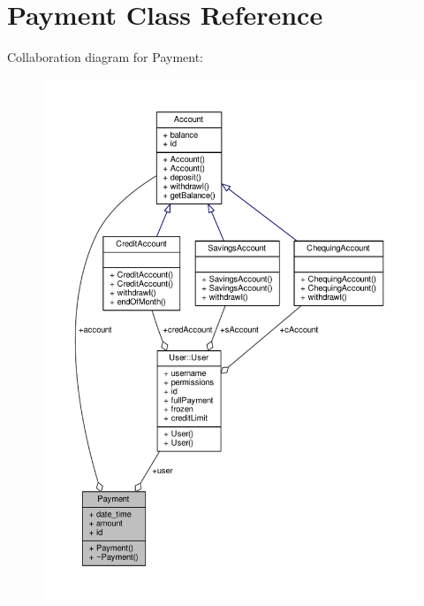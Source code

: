 \hypertarget{classPayment}{\section{Payment Class Reference}
\label{classPayment}
}


Collaboration diagram for Payment\-:
\nopagebreak
\begin{figure}[H]
\begin{center}
\leavevmode
\includegraphics[width=350pt]{classPayment__coll__graph}
\end{center}
\end{figure}
